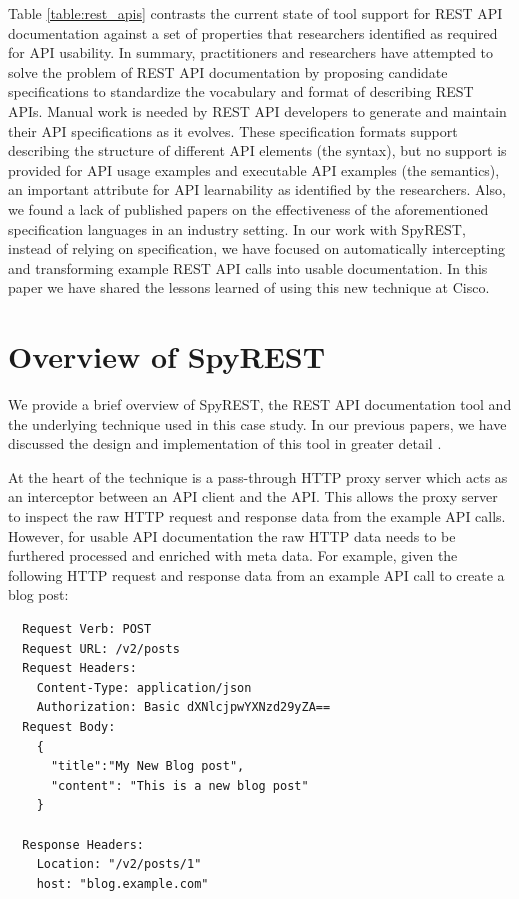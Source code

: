 \documentclass[10pt, conference]{IEEEtran}
\begin{document}
Table \ref{table:rest_apis} contrasts the current state of tool support for REST API documentation against a set of properties that researchers identified as required for API usability. In summary, practitioners and researchers have attempted to solve the problem of REST API documentation by proposing candidate specifications to standardize the vocabulary and format of describing REST APIs. Manual work is needed by REST API developers to generate and maintain their API specifications as it evolves. These specification formats support describing the structure of different API elements (the syntax), but no support is provided for API usage examples and executable API examples (the semantics), an important attribute for API learnability as identified by the researchers. Also, we found a lack of published papers on the effectiveness of the aforementioned specification languages in an industry setting. In our work with SpyREST, instead of relying on specification, we have focused on automatically intercepting and transforming example REST API calls into usable documentation. In this paper we have shared the lessons learned of using this new technique at Cisco.

\section{Overview of SpyREST} %
\label{sec:overview}
We provide a brief overview of SpyREST, the REST API documentation tool and the underlying technique used in this case study. In our previous papers, we have discussed the design and implementation of this tool in greater detail \cite{DBLP:conf/kbse/SohanAM15, DBLP:conf/kbse/SohanAM15a}.

At the heart of the technique is a pass-through HTTP proxy server which acts as an interceptor between an API client and the API. This allows the proxy server to inspect the raw HTTP request and response data from the example API calls. However, for usable API documentation the raw HTTP data needs to be furthered processed and enriched with meta data. For example, given the following HTTP request and response data from an example API call to create a blog post:
\begin{lstlisting}
  Request Verb: POST
  Request URL: /v2/posts
  Request Headers:
    Content-Type: application/json
    Authorization: Basic dXNlcjpwYXNzd29yZA==
  Request Body:
    {
      "title":"My New Blog post",
      "content": "This is a new blog post"
    }

  Response Headers:
    Location: "/v2/posts/1"
    host: "blog.example.com"

\end{lstlisting}
\end{document}
